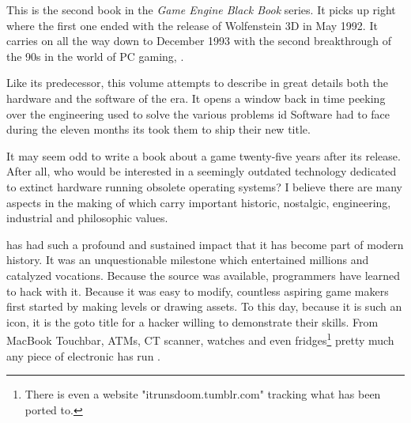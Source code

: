 This is the second book in the \textit{Game Engine Black Book} series. It picks up right where the first one ended with the release of Wolfenstein 3D in May 1992. It carries on all the way down to December 1993 with the second breakthrough of the 90s in the world of PC gaming, \doom.\\
\par
 Like its predecessor, this volume attempts to describe in great details both the hardware and the software of the era. It opens a window back in time peeking over the engineering used to solve the various problems id Software had to face during the eleven months its took them to ship their new title.\\%
\par
It may seem odd to write a book about a game twenty-five years after its release. After all, who would be interested in a seemingly outdated technology dedicated to extinct hardware running obsolete operating systems? I believe there are many aspects in the making of \doom which carry important historic, nostalgic, engineering, industrial and philosophic values.\\ 

\par
\doom has had such a profound and sustained impact that it has become part of modern history. It was an unquestionable milestone which entertained millions and catalyzed vocations. Because the source was available, programmers have learned to hack with it. Because it was easy to modify, countless aspiring game makers first started by making levels or drawing assets. To this day, because it is such an icon, it is the goto title for a hacker willing to demonstrate their skills. From MacBook Touchbar, ATMs, CT scanner, watches and even fridges\footnote{There is even a website "itrunsdoom.tumblr.com" tracking what \doom has been ported to.} pretty much any piece of electronic has run \doom.\\
\par

